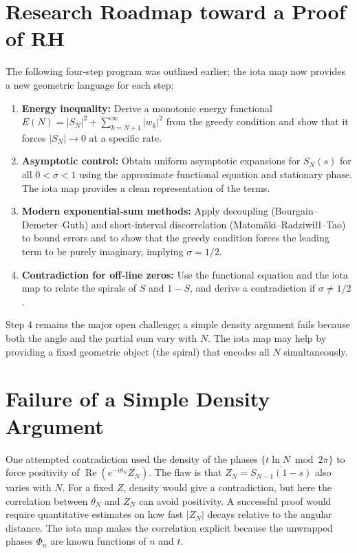 \documentclass[12pt,a4paper]{article}
\begin{document}
\section{Research Roadmap toward a Proof of RH}

The following four‑step program was outlined earlier; the iota map now provides a new geometric language for each step:

\begin{enumerate}
    \item \textbf{Energy inequality:} Derive a monotonic energy functional $E(N)=|S_N|^2+\sum_{k=N+1}^\infty |w_k|^2$ from the greedy condition and show that it forces $|S_N|\to0$ at a specific rate.
    \item \textbf{Asymptotic control:} Obtain uniform asymptotic expansions for $S_N(s)$ for all $0<\sigma<1$ using the approximate functional equation and stationary phase. The iota map provides a clean representation of the terms.
    \item \textbf{Modern exponential‑sum methods:} Apply decoupling (Bourgain–Demeter–Guth) and short‑interval discorrelation (Matomäki–Radziwiłł–Tao) to bound errors and to show that the greedy condition forces the leading term to be purely imaginary, implying $\sigma=1/2$.
    \item \textbf{Contradiction for off‑line zeros:} Use the functional equation and the iota map to relate the spirals of $S$ and $1-S$, and derive a contradiction if $\sigma\neq1/2$.
\end{enumerate}

Step 4 remains the major open challenge; a simple density argument fails because both the angle and the partial sum vary with $N$. The iota map may help by providing a fixed geometric object (the spiral) that encodes all $N$ simultaneously.

\section{Failure of a Simple Density Argument}

One attempted contradiction used the density of the phases $\{t\ln N\bmod2\pi\}$ to force positivity of $\operatorname{Re}(e^{-i\theta_N}\overline{Z_N})$. The flaw is that $Z_N = \overline{S_{N-1}(1-s)}$ also varies with $N$. For a fixed $Z$, density would give a contradiction, but here the correlation between $\theta_N$ and $Z_N$ can avoid positivity. A successful proof would require quantitative estimates on how fast $|Z_N|$ decays relative to the angular distance. The iota map makes the correlation explicit because the unwrapped phases $\Phi_n$ are known functions of $n$ and $t$.
\end{document}
